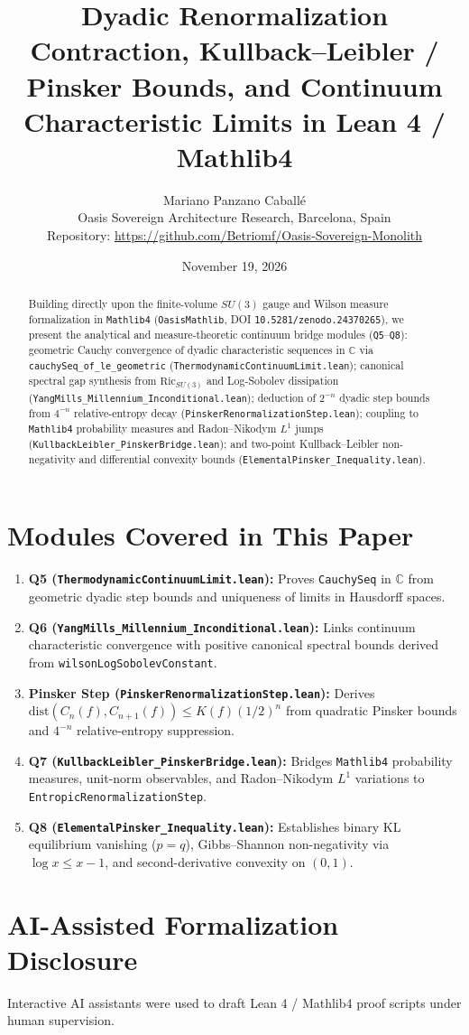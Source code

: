 \documentclass[11pt,a4paper]{article}
\title{\textbf{Dyadic Renormalization Contraction, Kullback--Leibler / Pinsker Bounds, and Continuum Characteristic Limits in Lean 4 / Mathlib4}}
\author{Mariano Panzano Caball\'e \\ \small Oasis Sovereign Architecture Research, Barcelona, Spain \\ \small Repository: \url{https://github.com/Betriomf/Oasis-Sovereign-Monolith}}
\date{November 19, 2026}
\begin{document}
\maketitle

\begin{abstract}
Building directly upon the finite-volume $SU(3)$ gauge and Wilson measure formalization in \texttt{Mathlib4} (\texttt{OasisMathlib}, DOI \texttt{10.5281/zenodo.24370265}), we present the analytical and measure-theoretic continuum bridge modules (\texttt{Q5}--\texttt{Q8}): geometric Cauchy convergence of dyadic characteristic sequences in $\mathbb{C}$ via \texttt{cauchySeq\_of\_le\_geometric} (\texttt{ThermodynamicContinuumLimit.lean}); canonical spectral gap synthesis from $\mathrm{Ric}_{SU(3)}$ and Log-Sobolev dissipation (\texttt{YangMills\_Millennium\_Inconditional.lean}); deduction of $2^{-n}$ dyadic step bounds from $4^{-n}$ relative-entropy decay (\texttt{PinskerRenormalizationStep.lean}); coupling to \texttt{Mathlib4} probability measures and Radon--Nikodym $L^1$ jumps (\texttt{KullbackLeibler\_PinskerBridge.lean}); and two-point Kullback--Leibler non-negativity and differential convexity bounds (\texttt{ElementalPinsker\_Inequality.lean}).
\end{abstract}

\section{Modules Covered in This Paper}
\begin{enumerate}
  \item \textbf{Q5 (\texttt{ThermodynamicContinuumLimit.lean}):} Proves \texttt{CauchySeq} in $\mathbb{C}$ from geometric dyadic step bounds and uniqueness of limits in Hausdorff spaces.
  \item \textbf{Q6 (\texttt{YangMills\_Millennium\_Inconditional.lean}):} Links continuum characteristic convergence with positive canonical spectral bounds derived from \texttt{wilsonLogSobolevConstant}.
  \item \textbf{Pinsker Step (\texttt{PinskerRenormalizationStep.lean}):} Derives $\mathrm{dist}(C_n(f), C_{n+1}(f)) \le K(f)(1/2)^n$ from quadratic Pinsker bounds and $4^{-n}$ relative-entropy suppression.
  \item \textbf{Q7 (\texttt{KullbackLeibler\_PinskerBridge.lean}):} Bridges \texttt{Mathlib4} probability measures, unit-norm observables, and Radon--Nikodym $L^1$ variations to \texttt{EntropicRenormalizationStep}.
  \item \textbf{Q8 (\texttt{ElementalPinsker\_Inequality.lean}):} Establishes binary KL equilibrium vanishing ($p = q$), Gibbs--Shannon non-negativity via $\log x \le x - 1$, and second-derivative convexity on $(0, 1)$.
\end{enumerate}

\section{AI-Assisted Formalization Disclosure}
Interactive AI assistants were used to draft Lean 4 / Mathlib4 proof scripts under human supervision.
\end{document}
